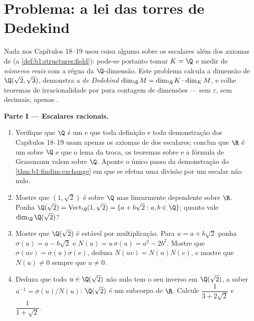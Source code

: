 \section{Problema: a lei das torres de Dedekind}

\begin{problem}\label{pb:b1:findim:1}
Nada nos Capítulos 18--19 usou coisa alguma sobre os escalares além
dos axiomas de  (a \cref{def:b1:structures:field}): pode-se portanto tomar $K = \Q$ e
medir  de \emph{números reais} com a régua da
$\Q$-dimensão. Este problema calcula a dimensão de $\Q(\sqrt2, \sqrt3)$,
demonstra a \emph{ de Dedekind} $\dim_\Q M = \dim_\Q K \cdot \dim_K M$, e colhe
teoremas de irracionalidade por pura contagem de dimensões --- sem
$\varepsilon$, sem decimais, apenas .

\medskip
\noindent\textbf{Parte I --- Escalares racionais.}
\begin{enumerate}
  \item Verifique que $\Q$ é um  e que toda definição e toda
        demonstração dos Capítulos 18--19 usam apenas os axiomas de
         dos escalares; conclua que $\R$ é um 
        sobre $\Q$ e que o lema da troca, os teoremas sobre  e
        a fórmula de Grassmann valem sobre $\Q$. Aponte o único
        passo da demonstração do \cref{thm:b1:findim:exchange} em que se efetua uma divisão
        por um escalar não nulo.
  \item Mostre que $(1, \sqrt2)$ é  sobre $\Q$ mas linearmente
        dependente sobre $\R$. Ponha $\Q(\sqrt2) = \operatorname{Vect}_\Q(1,
        \sqrt2) = \{a + b\sqrt2 : a, b \in \Q\}$; quanto vale $\dim_\Q \Q(\sqrt2)$?
  \item Mostre que $\Q(\sqrt2)$ é estável por multiplicação.
        Para $u = a + b\sqrt2$ ponha $\sigma(u) = a - b\sqrt2$ e $N(u) = u\,\sigma(u) = a^2 - 2b^2$. Mostre que $\sigma(uv) =
        \sigma(u)\sigma(v)$,
        deduza $N(uv) = N(u)N(v)$, e mostre que $N(u) \neq 0$ sempre que $u \neq 0$.
  \item Deduza que todo $u \in \Q(\sqrt2)$ não nulo tem o seu inverso em
        $\Q(\sqrt2)$, a saber $u^{-1} =
        \sigma(u)/N(u)$: $\Q(\sqrt2)$ é um subcorpo de $\R$.
        Calcule $\dfrac1{3 + 2\sqrt2}$ e $\dfrac1{1 + \sqrt2}$.
\end{enumerate}


\end{problem}
